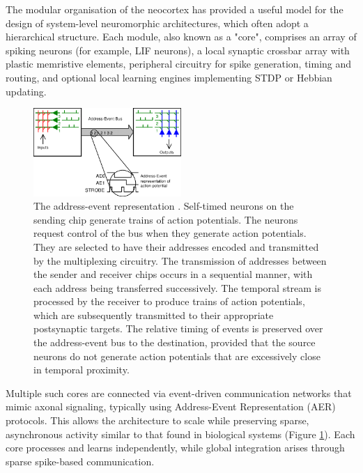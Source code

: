 \noindent The modular organisation of the neocortex has provided a useful model for the design of system-level neuromorphic architectures, which often adopt a hierarchical structure. Each module, also known as a "core", comprises an array of spiking neurons (for example, LIF neurons), a local synaptic crossbar array with plastic memristive elements, peripheral circuitry for spike generation, timing and routing, and optional local learning engines implementing STDP or Hebbian updating.\\

\begin{figure}[htbp!] 
    \centering    
    \includegraphics[width=0.5\textwidth]{Chapter2/Figs/i.png}
    \caption[The address-event representation.]{The address-event representation \cite{deiss1999pulse}. Self-timed neurons on the sending chip generate trains of action potentials. The neurons request control of the bus when they generate action potentials. They are selected to have their addresses encoded and transmitted by the multiplexing circuitry. The transmission of addresses between the sender and receiver chips occurs in a sequential manner, with each address being transferred successively. The temporal stream is processed by the receiver to produce trains of action potentials, which are subsequently transmitted to their appropriate postsynaptic targets. The relative timing of events is preserved over the address-event bus to the destination, provided that the source neurons do not generate action potentials that are excessively close in temporal proximity.}
    \label{fig:2i}
\end{figure}
    
\noindent Multiple such cores are connected via event-driven communication networks that mimic axonal signaling, typically using Address-Event Representation (AER) protocols. This allows the architecture to scale while preserving sparse, asynchronous activity similar to that found in biological systems (Figure \ref{fig:2i}). Each core processes and learns independently, while global integration arises through sparse spike-based communication.\\

